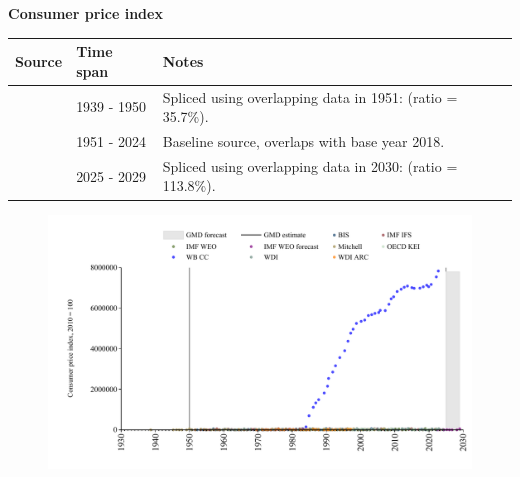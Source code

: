 \documentclass[12pt,a4paper,landscape]{article}
\begin{document}
\begin{adjustbox}{max totalsize={\paperwidth}{\paperheight},center}
\begin{minipage}[t][\textheight][t]{\textwidth}
\vspace*{0.5cm}
{}
\begin{center}
{\Large\bfseries Consumer price index}
\end{center}
\vspace{0.5cm}
\begin{table}[H]
\centering
\small
\begin{tabular}{|l|l|l|}
\hline
\textbf{Source} & \textbf{Time span} & \textbf{Notes} \\
\hline
\rowcolor{white}\cite{Mitchell}& 1939 - 1950 &Spliced using overlapping data in 1951: (ratio = 35.7\%). \\
\rowcolor{lightgray}\cite{BIS}& 1951 - 2024 &Baseline source, overlaps with base year 2018. \\
\rowcolor{white}\cite{IMF_WEO_forecast}& 2025 - 2029 &Spliced using overlapping data in 2030: (ratio = 113.8\%). \\
\hline
\end{tabular}
\end{table}
\begin{figure}[H]
\centering
\includegraphics[width=\textwidth,height=0.6\textheight,keepaspectratio]{graphs/ISR_CPI.pdf}
\end{figure}
\end{minipage}
\end{adjustbox}
\end{document}
